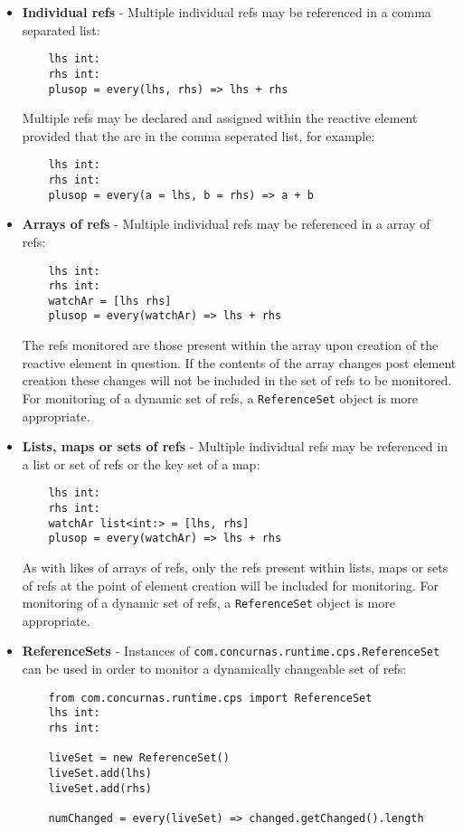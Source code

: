 \documentclass[conc-doc]{subfiles}
\begin{document}
\begin{itemize}
	\item \textbf{Individual refs} - Multiple individual refs may be referenced in a comma separated list:
	\begin{lstlisting}
	lhs int:
	rhs int:
	plusop = every(lhs, rhs) => lhs + rhs	
	\end{lstlisting}
	Multiple refs may be declared and assigned within the reactive element provided that the are in the comma seperated list, for example:
	\begin{lstlisting}
	lhs int:
	rhs int:
	plusop = every(a = lhs, b = rhs) => a + b
	\end{lstlisting}	
	\item \textbf{Arrays of refs} - Multiple individual refs may be referenced in a array of refs:
	\begin{lstlisting}
	lhs int:
	rhs int:
	watchAr = [lhs rhs]
	plusop = every(watchAr) => lhs + rhs
	\end{lstlisting}
	The refs monitored are those present within the array upon creation of the reactive element in question. If the contents of the array changes post element creation these changes will not be included in the set of refs to be monitored. For monitoring of a dynamic set of refs, a \lstinline{ReferenceSet} object is more appropriate.
	\item \textbf{Lists, maps or sets of refs} - Multiple individual refs may be referenced in a list or set of refs or the key set of a map:
	\begin{lstlisting}
	lhs int:
	rhs int:
	watchAr list<int:> = [lhs, rhs]
	plusop = every(watchAr) => lhs + rhs
	\end{lstlisting}
	As with likes of arrays of refs, only the refs present within lists, maps or sets of refs at the point of element creation will be included for monitoring. For monitoring of a dynamic set of refs, a \lstinline{ReferenceSet} object is more appropriate.	
	\item \textbf{ReferenceSets} - Instances of \lstinline{com.concurnas.runtime.cps.ReferenceSet} can be used in order to monitor a dynamically changeable set of refs:
	\begin{lstlisting}
	from com.concurnas.runtime.cps import ReferenceSet
	lhs int:
	rhs int:
	
	liveSet = new ReferenceSet()
	liveSet.add(lhs)
	liveSet.add(rhs)
		
	numChanged = every(liveSet) => changed.getChanged().length
	

\end{lstlisting}
\end{itemize}
\end{document}
